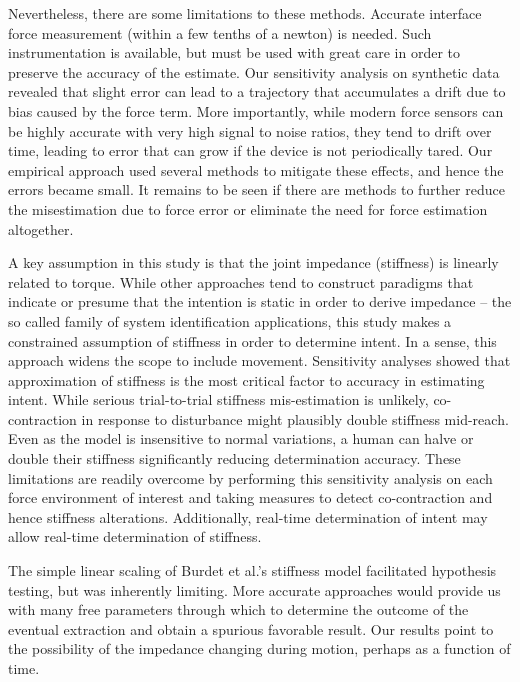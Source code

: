 Nevertheless, there are some limitations to these methods. Accurate interface force measurement (within a few tenths of a newton) is needed. Such instrumentation is available, but must be used with great care in order to preserve the accuracy of the estimate. Our sensitivity analysis on synthetic data revealed that slight error can lead to a trajectory that accumulates a drift due to bias caused by the force term. More importantly, while modern force sensors can be highly accurate with very high signal to noise ratios, they tend to drift over time, leading to error that can grow if the device is not periodically tared. Our empirical approach used several methods to mitigate these effects, and hence the errors became small. It remains to be seen if there are methods to further reduce the misestimation due to force error or eliminate the need for force estimation altogether.  

A key assumption in this study is that the joint impedance (stiffness) is linearly related to torque. While other approaches tend to construct paradigms that indicate or presume that the intention is static in order to derive impedance -- the so called family of system identification applications, this study makes a constrained assumption of stiffness in order to determine intent. In a sense, this approach widens the scope to include movement. Sensitivity analyses showed that approximation of stiffness is the most critical factor to accuracy in estimating intent. While serious trial-to-trial stiffness mis-estimation is unlikely, co-contraction in response to disturbance might plausibly double stiffness mid-reach. Even as the model is insensitive to normal variations, a human can halve or double their stiffness \cite{franklin2007endpoint} significantly reducing determination accuracy. These limitations are readily overcome by performing this sensitivity analysis on each force environment of interest and taking measures to detect co-contraction and hence stiffness alterations. Additionally, real-time determination of intent may allow real-time determination of stiffness.

The simple linear scaling of Burdet et al.'s stiffness model \cite{burdet2006stability} facilitated hypothesis testing, but was inherently limiting. More accurate approaches would provide us with many free parameters through which to determine the outcome of the eventual extraction and obtain a spurious favorable result. Our results point to the possibility of the impedance changing during motion, perhaps as a function of time. 

